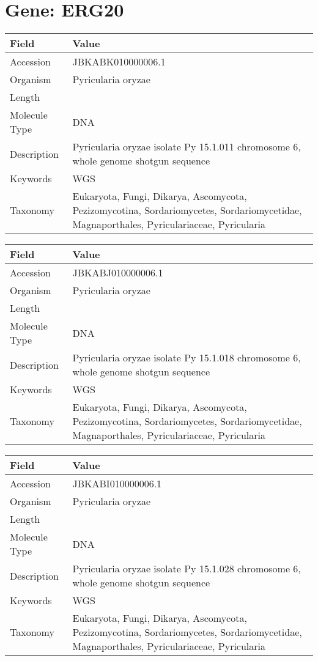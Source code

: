 \documentclass[10pt]{article}
\begin{document}
\section*{Gene: ERG20}
{\footnotesize
\begin{longtable}{>{\raggedright\arraybackslash}p{4.5cm} >{\raggedright\arraybackslash}p{11.5cm}}
\textbf{Field} & \textbf{Value} \\
\hline
Accession & JBKABK010000006.1 \\
Organism & Pyricularia oryzae \\
Length & 6072706 \\
Molecule Type & DNA \\
Description & Pyricularia oryzae isolate Py 15.1.011 chromosome 6, whole genome shotgun sequence \\
Keywords & WGS \\
Taxonomy & Eukaryota, Fungi, Dikarya, Ascomycota, Pezizomycotina, Sordariomycetes, Sordariomycetidae, Magnaporthales, Pyriculariaceae, Pyricularia \\
\end{longtable}
}

{\footnotesize
\begin{longtable}{>{\raggedright\arraybackslash}p{4.5cm} >{\raggedright\arraybackslash}p{11.5cm}}
\textbf{Field} & \textbf{Value} \\
\hline
Accession & JBKABJ010000006.1 \\
Organism & Pyricularia oryzae \\
Length & 5939575 \\
Molecule Type & DNA \\
Description & Pyricularia oryzae isolate Py 15.1.018 chromosome 6, whole genome shotgun sequence \\
Keywords & WGS \\
Taxonomy & Eukaryota, Fungi, Dikarya, Ascomycota, Pezizomycotina, Sordariomycetes, Sordariomycetidae, Magnaporthales, Pyriculariaceae, Pyricularia \\
\end{longtable}
}

{\footnotesize
\begin{longtable}{>{\raggedright\arraybackslash}p{4.5cm} >{\raggedright\arraybackslash}p{11.5cm}}
\textbf{Field} & \textbf{Value} \\
\hline
Accession & JBKABI010000006.1 \\
Organism & Pyricularia oryzae \\
Length & 6054307 \\
Molecule Type & DNA \\
Description & Pyricularia oryzae isolate Py 15.1.028 chromosome 6, whole genome shotgun sequence \\
Keywords & WGS \\
Taxonomy & Eukaryota, Fungi, Dikarya, Ascomycota, Pezizomycotina, Sordariomycetes, Sordariomycetidae, Magnaporthales, Pyriculariaceae, Pyricularia \\
\end{longtable}
}
\end{document}

